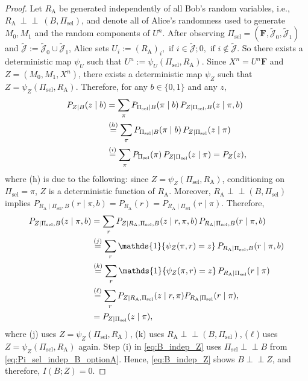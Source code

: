 \documentclass[onecolumn]{IEEEtran} %
\newcommand{\bF}{\mathbf F}
\newcommand{\1}{\mathbbm{1}}
\theoremstyle{boldremark}
\newcommand{\pperp}{\mathrel{\perp\!\!\!\perp}}
\begin{document}
\begin{proof}
Let $R_{\mathrm A}$ be generated independently of all Bob's random variables, i.e., $R_{\mathrm A} \ \pperp\ (B,\Pi_{\mathrm{sel}})$, and denote all of Alice’s randomness used to generate $M_0,M_1$ and the random components of $U^n$.
After observing $\Pi_{\mathrm{sel}}=(\bF,\tilde{\mathcal J}_0,\tilde{\mathcal J}_1)$ and
$\tilde{\mathcal J}:=\tilde{\mathcal J}_0\cup \tilde{\mathcal J}_1$, Alice sets
$U_i := 
(R_{\mathrm A})_i, \mbox{ if } i\in \tilde{\mathcal J};
0, \mbox{ if } i\notin \tilde{\mathcal J}$. So there exists a deterministic map $\psi_U$ such that $U^n:=\psi_U(\Pi_{\mathrm{sel}},R_{\mathrm A})$. Since $X^n=U^n\bF$ and $Z=(M_0,M_1,X^n)$, there exists a deterministic map $\psi_Z$ such that $Z=\psi_Z(\Pi_{\mathrm{sel}},R_{\mathrm A})$. Therefore, for any $b\in\{0,1\}$ and any $z$,
\begin{align}
P_{Z\mid B}(z\mid b)
&=\sum_{\pi} P_{\Pi_{\mathrm{sel}}\mid B}(\pi\mid b)\,P_{Z\mid \Pi_{\mathrm{sel}},B}(z\mid \pi,b)\notag\\
&\overset{(h)}{=}\sum_{\pi} P_{\Pi_{\mathrm{sel}}\mid B}(\pi\mid b)\,P_{Z\mid \Pi_{\mathrm{sel}}}(z\mid \pi)\notag\\
&\overset{(i)}{=}\sum_{\pi} P_{\Pi_{\mathrm{sel}}}(\pi)\,P_{Z\mid \Pi_{\mathrm{sel}}}(z\mid \pi)
= P_Z(z),
\label{eq:B_indep_Z}
\end{align}
where (h) is due to the following: since $Z=\psi_Z(\Pi_{\mathrm{sel}},R_{\mathrm A})$, conditioning on
$\Pi_{\mathrm{sel}}=\pi$, $Z$ is a deterministic function of $R_{\mathrm A}$.
Moreover, $R_{\mathrm A}\pperp (B,\Pi_{\mathrm{sel}})$ implies
$P_{R_{\mathrm A}\mid \Pi_{\mathrm{sel}},B}(r\mid \pi,b)=P_{R_{\mathrm A}}(r)
= P_{R_{\mathrm A}\mid \Pi_{\mathrm{sel}}}(r\mid \pi)$.
Therefore,
\begin{align}
P_{Z\mid \Pi_{\mathrm{sel}},B}(z\mid \pi,b)
&=\sum_{r} P_{Z\mid R_{\mathrm A},\Pi_{\mathrm{sel}},B}(z\mid r,\pi,b)\,
          P_{R_{\mathrm A}\mid \Pi_{\mathrm{sel}},B}(r\mid \pi,b)\notag\\
&\overset{(j)}=\sum_{r} \mathds{1}\{\psi_Z(\pi,r)=z\}\,
          P_{R_{\mathrm A}\mid \Pi_{\mathrm{sel}},B}(r\mid \pi,b)\notag\\
&\overset{(k)}{=}\sum_{r} \mathds{1}\{\psi_Z(\pi,r)=z\}\,
          P_{R_{\mathrm A}\mid \Pi_{\mathrm{sel}}}(r\mid \pi)\notag\\
&\overset{(\ell)}{=}\sum_{r} P_{Z\mid R_{\mathrm A},\Pi_{\mathrm{sel}}}(z\mid r,\pi)
          P_{R_{\mathrm A}\mid \Pi_{\mathrm{sel}}}(r\mid \pi),\notag\\
&\overset{}{=}P_{Z\mid \Pi_{\mathrm{sel}}}(z\mid \pi),\label{eq:pushforward_Z_given_Pi}
\end{align}
where (j) uses $Z=\psi_Z(\Pi_{\mathrm{sel}},R_{\mathrm A})$, (k) uses  $R_{\mathrm A} \pperp (B,\Pi_{\mathrm{sel}})$, ($\ell$) uses  $Z=\psi_Z(\Pi_{\mathrm{sel}},R_{\mathrm A})$ again. Step (i) in \eqref{eq:B_indep_Z} uses $\Pi_{\mathrm{sel}}\pperp B$ from \eqref{eq:Pi_sel_indep_B_optionA}.
Hence, \eqref{eq:B_indep_Z} shows $B\pperp Z$, and therefore, $I(B;Z)=0$. 


\end{proof}
\end{document}
